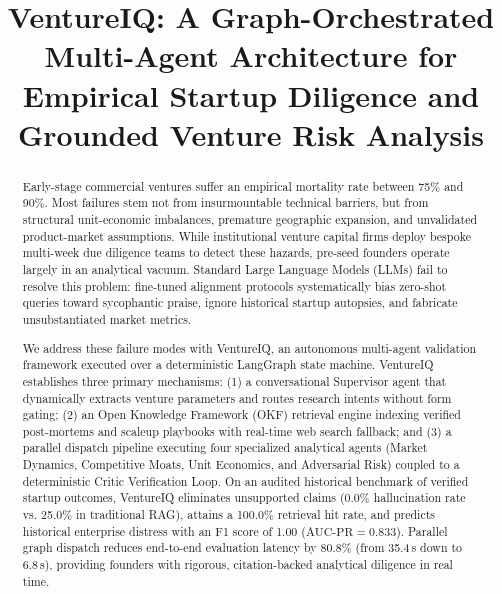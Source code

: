 \documentclass[conference]{IEEEtran}
\begin{document}
\title{VentureIQ: A Graph-Orchestrated Multi-Agent Architecture for Empirical Startup Diligence and Grounded Venture Risk Analysis}

\author{
}

\maketitle

\begin{abstract}
Early-stage commercial ventures suffer an empirical mortality rate between 75\% and 90\%. Most failures stem not from insurmountable technical barriers, but from structural unit-economic imbalances, premature geographic expansion, and unvalidated product-market assumptions. While institutional venture capital firms deploy bespoke multi-week due diligence teams to detect these hazards, pre-seed founders operate largely in an analytical vacuum. Standard Large Language Models (LLMs) fail to resolve this problem: fine-tuned alignment protocols systematically bias zero-shot queries toward sycophantic praise, ignore historical startup autopsies, and fabricate unsubstantiated market metrics. 

We address these failure modes with VentureIQ, an autonomous multi-agent validation framework executed over a deterministic LangGraph state machine. VentureIQ establishes three primary mechanisms: (1) a conversational Supervisor agent that dynamically extracts venture parameters and routes research intents without form gating; (2) an Open Knowledge Framework (OKF) retrieval engine indexing verified post-mortems and scaleup playbooks with real-time web search fallback; and (3) a parallel dispatch pipeline executing four specialized analytical agents (Market Dynamics, Competitive Moats, Unit Economics, and Adversarial Risk) coupled to a deterministic Critic Verification Loop. On an audited historical benchmark of verified startup outcomes, VentureIQ eliminates unsupported claims (0.0\% hallucination rate vs. 25.0\% in traditional RAG), attains a 100.0\% retrieval hit rate, and predicts historical enterprise distress with an F1 score of 1.00 ($\text{AUC-PR} = 0.833$). Parallel graph dispatch reduces end-to-end evaluation latency by 80.8\% (from 35.4\,s down to 6.8\,s), providing founders with rigorous, citation-backed analytical diligence in real time.
\end{abstract}
\end{document}
